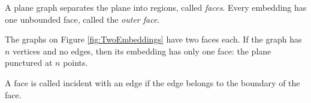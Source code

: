 

\setcounter{section}{3}
\setcounter{subsection}{2}
\setcounter{dfn}{4}

A plane graph separates the plane into regions, called \emph{faces}.
Every embedding has one unbounded face, called the \emph{outer face}.

The graphs on Figure \ref{fig:TwoEmbeddings} have two faces each.
If the graph has $n$ vertices and no edges, then its embedding has only one face: the plane punctured at $n$ points.

A face is called incident with an edge if the edge belongs to the boundary of the face.


